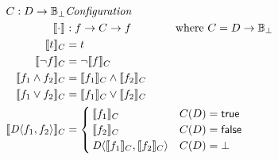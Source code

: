 \begin{align*}
  C : D \rightarrow \mathbb{B_{\bot}} & \textit{Configuration} \\
  \sem{\cdot} &: f\rightarrow C \rightarrow f
    \qquad\qquad \text{where } C = D\rightarrow\mathbb{B}_\bot \\
  \sem[C]{t}             &= t \\
  \sem[C]{\neg f}        &= \neg \sem[C]{f} \\
  \sem[C]{f_1\wedge f_2} &= \sem[C]{f_1}\wedge\sem[C]{f_2}\\
  \sem[C]{f_1\vee f_2}   &= \sem[C]{f_1}\vee\sem[C]{f_2}\\
  \sem[C]{\chc[D]{f_1,f_2}} &=
    \begin{cases}
      \sem[C]{f_1}                       & C(D) = \true \\
      \sem[C]{f_2}                       & C(D) = \false \\
      \chc[D]{\sem[C]{f_1},\sem[C]{f_2}} & C(D) = \bot \\
    \end{cases}
\end{align*}
